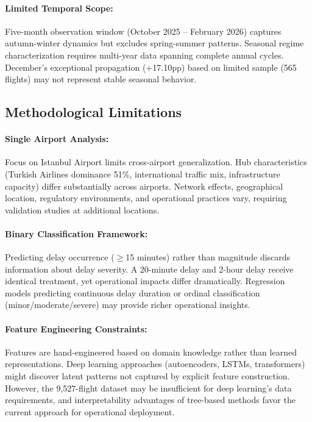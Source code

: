 \documentclass{report}
\begin{document}
\paragraph{Limited Temporal Scope:} Five-month observation window (October 2025 – February 2026) captures autumn-winter dynamics but excludes spring-summer patterns. Seasonal regime characterization requires multi-year data spanning complete annual cycles. December's exceptional propagation (+17.10pp) based on limited sample (565 flights) may not represent stable seasonal behavior.

\subsection{Methodological Limitations}

\paragraph{Single Airport Analysis:} Focus on Istanbul Airport limits cross-airport generalization. Hub characteristics (Turkish Airlines dominance 51\%, international traffic mix, infrastructure capacity) differ substantially across airports. Network effects, geographical location, regulatory environments, and operational practices vary, requiring validation studies at additional locations.

\paragraph{Binary Classification Framework:} Predicting delay occurrence ($\geq$15 minutes) rather than magnitude discards information about delay severity. A 20-minute delay and 2-hour delay receive identical treatment, yet operational impacts differ dramatically. Regression models predicting continuous delay duration or ordinal classification (minor/moderate/severe) may provide richer operational insights.

\paragraph{Feature Engineering Constraints:} Features are hand-engineered based on domain knowledge rather than learned representations. Deep learning approaches (autoencoders, LSTMs, transformers) might discover latent patterns not captured by explicit feature construction. However, the 9,527-flight dataset may be insufficient for deep learning's data requirements, and interpretability advantages of tree-based methods favor the current approach for operational deployment.
\end{document}
